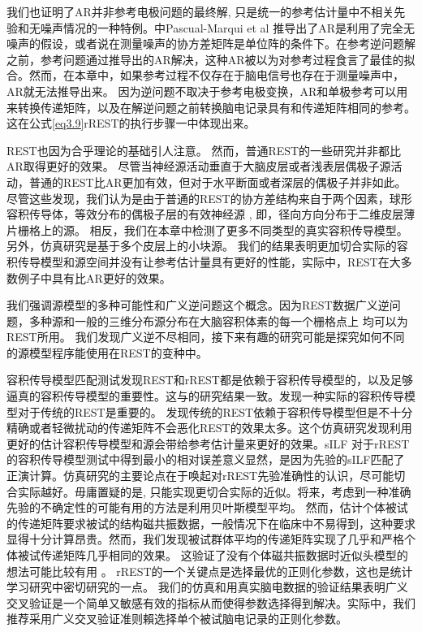 我们也证明了AR并非参考电极问题的最终解, 只是统一的参考估计量中不相关先验和无噪声情况的一种特例。\cite{pascual-marqui_assessing_2011}中Pascual-Marqui et al 推导出了AR是利用了完全无噪声的假设，或者说在测量噪声的协方差矩阵是单位阵的条件下。在参考逆问题解之前，参考问题通过推导出的AR解决，这种AR被以为对参考过程食言了最佳的拟合。然而，在本章中，如果参考过程不仅存在于脑电信号也存在于测量噪声中，AR就无法推导出来。 因为逆问题不取决于参考电极变换，AR和单极参考可以用来转换传递矩阵，以及在解逆问题之前转换脑电记录具有和传递矩阵相同的参考。 这在公式\eqref{eq3.9}rREST的执行步骤一中体现出来。 

REST也因为合乎理论的基础引人注意。 然而，普通REST的一些研究并非都比AR取得更好的效果。 尽管当神经源活动垂直于大脑皮层或者浅表层偶极子源活动，普通的REST比AR更加有效，但对于水平断面或者深层的偶极子并非如此。 尽管这些发现，我们认为是由于普通的REST的协方差结构来自于两个因素，球形容积传导体，等效分布的偶极子层的有效神经源 , 即，径向方向分布于二维皮层薄片栅格上的源。 相反，我们在本章中检测了更多不同类型的真实容积传导模型。另外，仿真研究是基于多个皮层上的小块源。 我们的结果表明更加切合实际的容积传导模型和源空间并没有让参考估计量具有更好的性能，实际中，REST在大多数例子中具有比AR更好的效果。

我们强调源模型的多种可能性和广义逆问题这个概念。因为REST数据广义逆问题，多种源和一般的三维分布源分布在大脑容积体素的每一个栅格点上 均可以为REST所用。 我们发现广义逆不尽相同，接下来有趣的研究可能是探究如何不同的源模型程序能使用在REST的变种中。

容积传导模型匹配测试发现REST和rREST都是依赖于容积传导模型的，以及足够逼真的容积传导模型的重要性。这与的研究结果一致。\cite{liu_q_estimating_2015}发现一种实际的容积传导模型对于传统的REST是重要的。 \cite{hu_how_2018}发现传统的REST依赖于容积传导模型但是不十分精确或者轻微扰动的传递矩阵不会恶化REST的效果太多。这个仿真研究发现利用更好的估计容积传导模型和源会带给参考估计量来更好的效果。sILF 对于rREST的容积传导模型测试中得到最小的相对误差意义显然，是因为先验的sILF匹配了正演计算。仿真研究的主要论点在于唤起对rREST先验准确性的认识，尽可能切合实际越好。毋庸置疑的是, 只能实现更切合实际的近似。将来，考虑到一种准确先验的不确定性的可能有用的方法是利用贝叶斯模型平均。 然而，估计个体被试的传递矩阵要求被试的结构磁共振数据，一般情况下在临床中不易得到，这种要求显得十分计算昂贵。然而，我们发现被试群体平均的传递矩阵实现了几乎和严格个体被试传递矩阵几乎相同的效果。 这验证了没有个体磁共振数据时近似头模型的想法可能比较有用 。 rREST的一个关键点是选择最优的正则化参数，这也是统计学习研究中密切研究的一点。 我们的仿真和用真实脑电数据的验证结果表明广义交叉验证是一个简单又敏感有效的指标从而使得参数选择得到解决。实际中，我们推荐采用广义交叉验证准则賴选择单个被试脑电记录的正则化参数。


